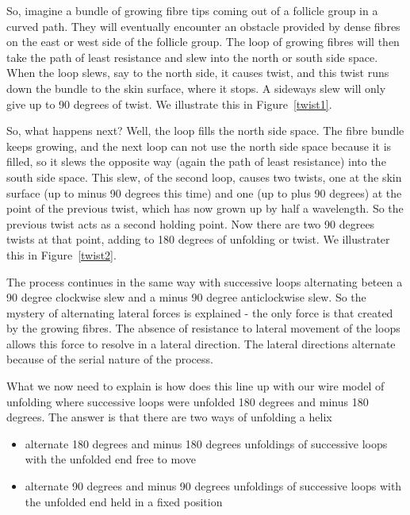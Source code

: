 \documentclass[titlepage,10pt]{article}  %
\begin{document}


So, imagine a bundle of growing fibre tips coming out of a follicle group in a curved path. They will eventually encounter an obstacle provided by dense fibres on the east or west side of the follicle group. The loop of growing fibres will then take the path of least resistance and slew into the north or south side space. When the loop slews, say to the north side, it causes twist, and this twist runs down the bundle to the skin surface, where it stops. A sideways slew will only give up to 90 degrees of twist. We illustrate this in Figure~\ref{twist1}.
 


So, what happens next? Well, the loop fills the north side space. The fibre bundle keeps growing, and the next loop can not use the north side space because it is filled, so it slews the opposite way (again the path of least resistance) into the south side space. This slew, of the second loop, causes two twists, one at the skin surface (up to minus 90 degrees this time) and one (up to plus 90 degrees) at the point of the previous twist, which has now grown up by half a wavelength. So the previous twist acts as a second holding point. Now there are two 90 degrees twists at that point, adding to 180 degrees of unfolding or twist. We illustrater this in Figure~\ref{twist2}.



The process continues in the same way with successive loops alternating beteen a 90 degree clockwise slew and a minus 90 degree anticlockwise slew. So the mystery of alternating lateral forces is explained - the only force is that created by the growing fibres. The absence of resistance to lateral movement of the loops allows this force to resolve in a lateral direction. The lateral directions alternate because of the serial nature of the process.

What we now need to explain is how does this line up with our wire model of unfolding where successive loops were unfolded 180 degrees and minus 180 degrees. The answer is that there are two ways of unfolding a helix
\begin{itemize}
\item alternate 180 degrees and minus 180 degrees unfoldings of successive loops with the unfolded end free to move
\item alternate 90 degrees and minus 90 degrees unfoldings of successive loops with the unfolded end held in a fixed position
\end{itemize}
\end{document}
